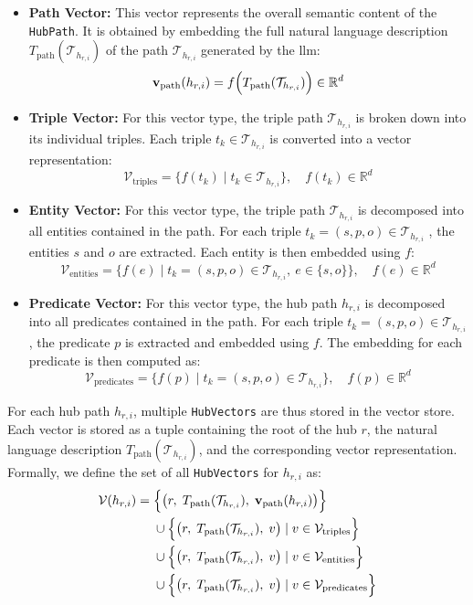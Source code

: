 \begin{itemize}
    \item \textbf{Path Vector:} This vector represents the overall semantic content of the \texttt{HubPath}. It is obtained by embedding the full natural language description $T_{\text{path}}(\mathcal{T}_{h_{r,i}})$ of the path $\mathcal{T}_{h_{r,i}}$ generated by the \gls{llm}:
    \[
    \mathbf{v}_{\text{path}}(h_{r,i}) = f\Bigl( T_{\text{path}}(\mathcal{T}_{h_{r,i}}) \Bigr) \in \mathbb{R}^d
    \]
    
    \item \textbf{Triple Vector:} For this vector type, the triple path $\mathcal{T}_{h_{r,i}}$ is broken down into its individual triples. Each triple \(t_k \in \mathcal{T}_{h_{r,i}}\) is converted into a vector representation:
    \[
    \mathcal{V}_{\text{triples}} = \{f (t_k) \mid t_k \in \mathcal{T}_{h_{r,i}}\}, \quad f(t_k) \in \mathbb{R}^d
    \]
    
    \item \textbf{Entity Vector:} For this vector type, the triple path $\mathcal{T}_{h_{r,i}}$ is decomposed into all entities contained in the path. For each triple \(t_k = (s,p,o) \in \mathcal{T}_{h_{r,i}}\) , the entities \(s\) and \(o\) are extracted. Each entity is then embedded using \(f\):
    \[
    \mathcal{V}_{\text{entities}} = \{f(e) \mid t_k = (s, p, o) \in \mathcal{T}_{h_{r,i}},\ e \in \{s, o\}\}, \quad f(e) \in \mathbb{R}^d
    \]

    \item \textbf{Predicate Vector:} For this vector type, the hub path \(h_{r,i}\) is decomposed into all predicates contained in the path. For each triple \(t_k = (s,p,o) \in \mathcal{T}_{h_{r,i}}\), the predicate $p$ is extracted and embedded using \(f\). The embedding for each predicate is then computed as:
    \[
    \mathcal{V}_{\text{predicates}} = \{f(p) \mid t_k = (s, p, o) \in \mathcal{T}_{h_{r,i}}\}, \quad f(p) \in \mathbb{R}^d
    \]
\end{itemize}

For each hub path \(h_{r,i}\), multiple \texttt{HubVectors} are thus stored in the vector store. Each vector is stored as a tuple containing the root of the hub \(r\), the natural language description \(T_{\text{path}}(\mathcal{T}_{h_{r,i}})\), and the corresponding vector representation. Formally, we define the set of all \texttt{HubVectors} for \(h_{r,i}\) as:
\[
\begin{aligned}
    \mathcal{V}(h_{r,i}) =\;
    & \Bigl\{ \bigl( r,\; T_{\text{path}}(\mathcal{T}_{h_{r,i}}),\; \mathbf{v}_{\text{path}}(h_{r,i}) \bigr) \Bigr\} \\
    & \cup \Bigl\{ \bigl( r,\; T_{\text{path}}(\mathcal{T}_{h_{r,i}}),\; v \bigr) \mid v \in \mathcal{V}_{\text{triples}} \Bigr\} \\
    & \cup \Bigl\{ \bigl( r,\; T_{\text{path}}(\mathcal{T}_{h_{r,i}}),\; v \bigr) \mid v \in \mathcal{V}_{\text{entities}} \Bigr\} \\
    & \cup \Bigl\{ \bigl( r,\; T_{\text{path}}(\mathcal{T}_{h_{r,i}}),\; v \bigr) \mid v \in \mathcal{V}_{\text{predicates}} \Bigr\} \\
\end{aligned}
\]

